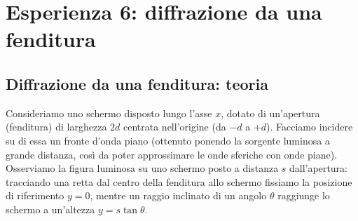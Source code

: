 \documentclass[openany,a4paper,12pt]{book}
\begin{document}
\section{Esperienza 6: diffrazione da una fenditura}

\subsection*{Diffrazione da una fenditura: teoria}

Consideriamo uno schermo disposto lungo l'asse $x$, dotato di un'apertura (fenditura) di larghezza $2d$ centrata nell'origine (da $-d$ a $+d$). Facciamo incidere su di essa un fronte d'onda piano (ottenuto ponendo la sorgente luminosa a grande distanza, così da poter approssimare le onde sferiche con onde piane).
Osserviamo la figura luminosa su uno schermo posto a distanza $s$ dall'apertura: tracciando una retta dal centro della fenditura allo schermo fissiamo la posizione di riferimento $y = 0$, mentre un raggio inclinato di un angolo $\theta$ raggiunge lo schermo a un'altezza $y = s\tan\theta$.
\end{document}
